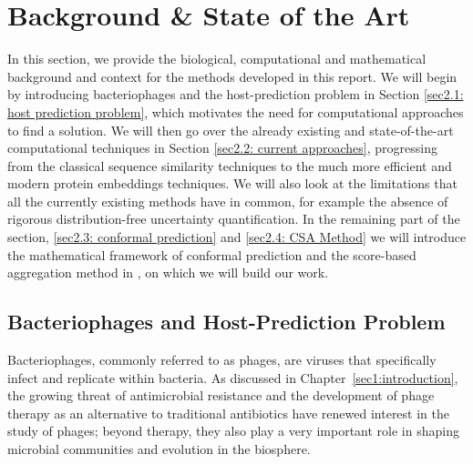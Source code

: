 \chapter{Background \& State of the Art}
\label{sec2: background}
In this section, we provide the biological, computational and mathematical background and context for the 
methods developed in this report. 
We will begin by introducing bacteriophages and the host-prediction problem in Section \ref{sec2.1: host prediction 
problem}, which motivates the need for computational approaches to find a solution. We will then go over the already 
existing and state-of-the-art computational techniques in Section \ref{sec2.2: current approaches}, progressing from the 
classical sequence similarity techniques to the much more efficient and modern protein embeddings techniques. We will 
also look at the limitations that all the currently existing methods have in common, for example the absence of rigorous 
distribution-free uncertainty quantification. In the remaining part of the section, \ref{sec2.3: conformal prediction} 
and \ref{sec2.4: CSA Method} we will introduce the mathematical framework of conformal prediction and the score-based 
aggregation method in \cite{ochoarivera2024conformal}, on which we will build our work.


\section{Bacteriophages and Host-Prediction Problem}
\label{sec2.1: host prediction problem}
Bacteriophages, commonly referred to as phages, are viruses that specifically infect and replicate within 
bacteria. As discussed in Chapter~\ref{sec1:introduction}, the growing threat of antimicrobial resistance and the development 
of phage therapy as an alternative to traditional antibiotics \cite{dejonge2019molecular} have renewed interest in the study 
of phages; beyond therapy, they also play a very important role in shaping microbial communities and evolution in the biosphere.

